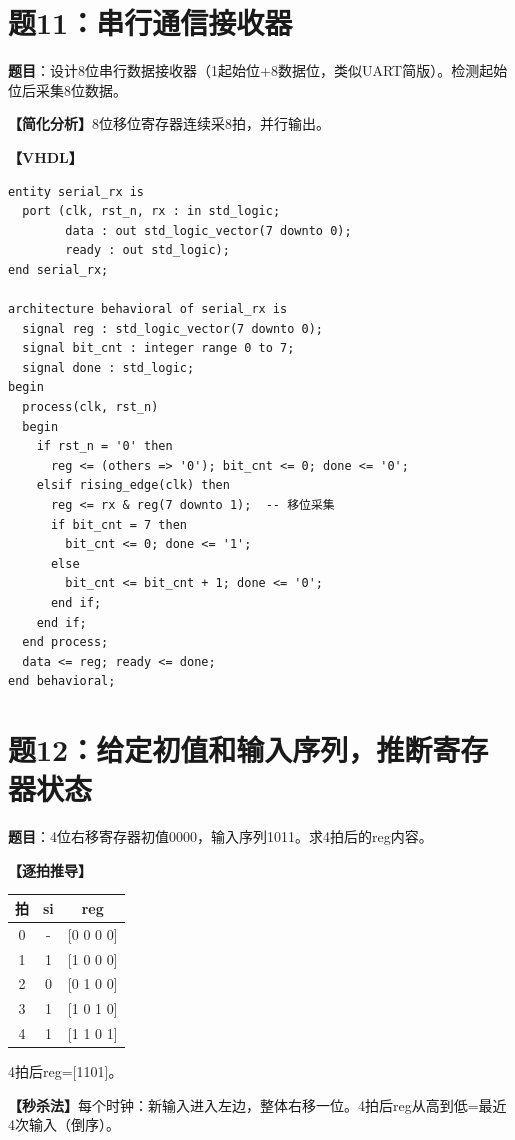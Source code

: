 \section{题11：串行通信接收器}

\textbf{题目}：设计8位串行数据接收器（1起始位+8数据位，类似UART简版）。检测起始位后采集8位数据。

\begin{solution}[完整解答]

\textbf{【简化分析】}8位移位寄存器连续采8拍，并行输出。

\textbf{【VHDL】}
\begin{lstlisting}
entity serial_rx is
  port (clk, rst_n, rx : in std_logic;
        data : out std_logic_vector(7 downto 0);
        ready : out std_logic);
end serial_rx;

architecture behavioral of serial_rx is
  signal reg : std_logic_vector(7 downto 0);
  signal bit_cnt : integer range 0 to 7;
  signal done : std_logic;
begin
  process(clk, rst_n)
  begin
    if rst_n = '0' then
      reg <= (others => '0'); bit_cnt <= 0; done <= '0';
    elsif rising_edge(clk) then
      reg <= rx & reg(7 downto 1);  -- 移位采集
      if bit_cnt = 7 then
        bit_cnt <= 0; done <= '1';
      else
        bit_cnt <= bit_cnt + 1; done <= '0';
      end if;
    end if;
  end process;
  data <= reg; ready <= done;
end behavioral;
\end{lstlisting}

\end{solution}


\section{题12：给定初值和输入序列，推断寄存器状态}

\textbf{题目}：4位右移寄存器初值0000，输入序列1011。求4拍后的reg内容。

\begin{solution}[完整解答]

\textbf{【逐拍推导】}
\begin{center}
\begin{tabular}{|c|c|c|}\hline
拍 & si & reg \\ \hline
0 & - & [0 0 0 0] \\ \hline
1 & 1 & [1 0 0 0] \\ \hline
2 & 0 & [0 1 0 0] \\ \hline
3 & 1 & [1 0 1 0] \\ \hline
4 & 1 & [1 1 0 1] \\ \hline
\end{tabular}
\end{center}

4拍后reg=[1101]。

\textbf{【秒杀法】}每个时钟：新输入进入左边，整体右移一位。4拍后reg从高到低=最近4次输入（倒序）。

\end{solution}


